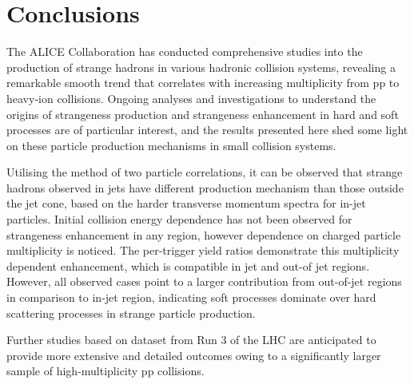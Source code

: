 \section{Conclusions}

The ALICE Collaboration has conducted comprehensive studies into the production of strange hadrons in various hadronic collision systems, 
revealing a remarkable smooth trend that correlates with increasing multiplicity from pp to heavy-ion collisions. Ongoing analyses and investigations 
to understand the origins of strangeness production and strangeness enhancement in hard and soft processes are of particular interest, and the results 
presented here shed some light on these particle production mechanisms in small collision systems.

Utilising the method of two particle correlations, it can be observed that strange hadrons observed in jets have different production mechanism than 
those outside the jet cone, based on the harder transverse momentum spectra for in-jet particles. Initial collision energy dependence has not been 
observed for strangeness enhancement in any region, however dependence on charged particle multiplicity is noticed. The per-trigger yield 
ratios demonstrate this multiplicity dependent enhancement, which is compatible in jet and out-of jet regions. However, all observed cases point to 
a larger contribution from out-of-jet regions in comparison to in-jet region, indicating soft processes dominate over hard scattering processes 
in strange particle production.

Further studies based on dataset from Run 3 of the LHC are anticipated to provide more extensive and detailed outcomes owing to a significantly larger 
sample of high-multiplicity pp collisions.
